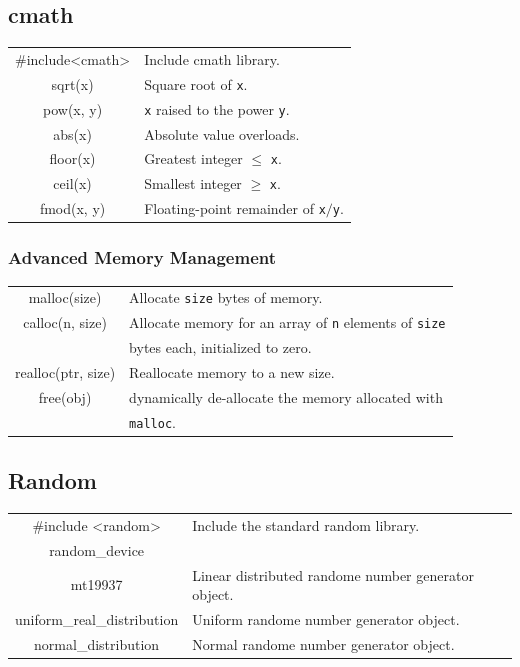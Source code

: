\documentclass[5pt]{article}
\begin{document}
\begin{multicols}{2}
\subsection{cmath}
\begin{tabular}{C L}
\#include<cmath>        & Include cmath library. \\
sqrt(x)                 & Square root of \texttt{x}. \\
pow(x, y)               & \texttt{x} raised to the power \texttt{y}. \\
abs(x)                  & Absolute value overloads. \\
floor(x)                & Greatest integer $\leq$ \texttt{x}. \\
ceil(x)                 & Smallest integer $\geq$ \texttt{x}. \\
fmod(x, y)              & Floating-point remainder of \texttt{x}$/$\texttt{y}. \\
\end{tabular}

\newpage
\subsubsection{Advanced Memory Management}
\begin{tabular}{C L}
    malloc(size)              & Allocate \texttt{size} bytes of memory.\\
    calloc(n, size)           & Allocate memory for an array of \texttt{n} elements of \texttt{size}\\
                              & bytes each, initialized to zero.\\
    realloc(ptr, size)        & Reallocate memory to a new size.\\
    free(obj)                 & dynamically de-allocate the memory allocated with\\
                              & \texttt{malloc}.\\
\end{tabular}

\subsection{Random}
\begin{tabular}{C L}
    \#include <random>          & Include the standard random library.\\
    random\_device              & \\
    mt19937                     & Linear distributed randome number generator object.\\
    uniform\_real\_distribution & Uniform randome number generator object.\\
    normal\_distribution        & Normal randome number generator object.
\end{tabular}


\end{multicols}
\end{document}
